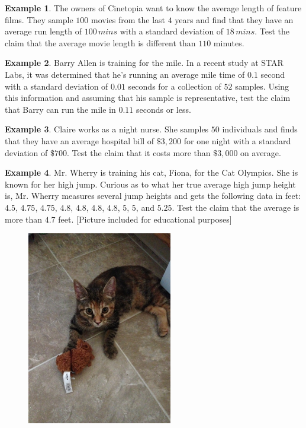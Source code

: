 \documentclass[12pt]{amsart}
\theoremstyle{definition}
\newtheorem{ex}{Example}
\begin{document}
\begin{ex}
	The owners of Cinetopia want to know the average length of feature films. They sample $100$ movies from the last $4$ years and find that they have an average run length of $100\,mins$ with a standard deviation of $18\,mins$. Test the claim that the average movie length is different than $110$ minutes.
\end{ex}

\begin{ex}
	Barry Allen is training for the mile. In a recent study at STAR Labs, it was determined that he's running an average mile time of $0.1$ second with a standard deviation of $0.01$ seconds for a collection of $52$ samples. Using this information and assuming that his sample is representative, test the claim that Barry can run the mile in $0.11$ seconds or less.
\end{ex}

\begin{ex}
	Claire works as a night nurse. She samples $50$ individuals and finds that they have an average hospital bill of $\$3,200$ for one night with a standard deviation of $\$700$. Test the claim that it costs more than $\$3,000$ on average.
\end{ex}

\begin{ex}
	Mr. Wherry is training his cat, Fiona, for the Cat Olympics. She is known for her high jump. Curious as to what her true average high jump height is, Mr. Wherry measures several jump heights and gets the following data in feet: $4.5$, $4.75$, $4.75$, $4.8$, $4.8$, $4.8$, $4.8$, $5$, $5$, and $5.25$. Test the claim that the average is more than $4.7$ feet. [Picture included for educational purposes]
\end{ex}

\begin{figure}[h]
 \centering
 \includegraphics[width=2.5in,keepaspectratio=true]{./IMG_1011.JPG}
 \label{fig: Fiona and Chewie}
\end{figure}
\end{document}
